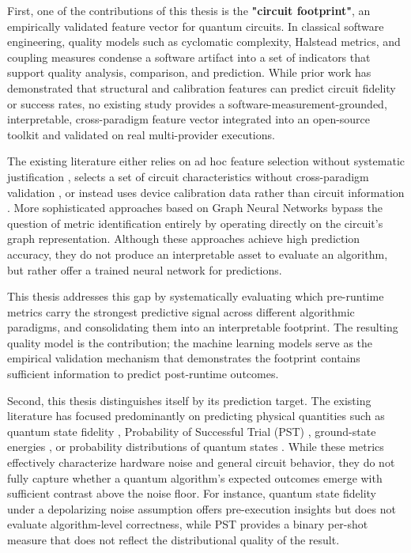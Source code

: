 \documentclass{article}
\begin{document}
First, one of the contributions of this thesis is the \textbf{"circuit footprint"}, an empirically validated feature vector for quantum circuits. In classical software engineering, quality models such as cyclomatic complexity, Halstead metrics, and coupling measures condense a software artifact into a set of indicators that support quality analysis, comparison, and prediction. While prior work has demonstrated that structural and calibration features can predict circuit fidelity or success rates, no existing study provides a software-measurement-grounded, interpretable, cross-paradigm feature vector integrated into an open-source toolkit and validated on real multi-provider executions.

The existing literature either relies on ad hoc feature selection without systematic justification \cite{saravananDataDrivenReliabilityModelsa_2023, aktarPredictingExpressibilityParameterized_2023}, selects a set of circuit characteristics without cross-paradigm validation \cite{liuReliabilityModelingNISQ_2020}, or instead uses device calibration data rather than circuit information \cite{escofetAccurateEfficientAnalytic_2025}. More sophisticated approaches based on Graph Neural Networks \cite{wangQuEstGraphTransformer_2022, wangTorchQuantumCaseStudya_2022} bypass the question of metric identification entirely by operating directly on the circuit's graph representation. Although these approaches achieve high prediction accuracy, they do not produce an interpretable asset to evaluate an algorithm, but rather offer a trained neural network for predictions.

This thesis addresses this gap by systematically evaluating which pre-runtime metrics carry the strongest predictive signal across different algorithmic paradigms, and consolidating them into an interpretable footprint. The resulting quality model is the contribution; the machine learning models serve as the empirical validation mechanism that demonstrates the footprint contains sufficient information to predict post-runtime outcomes.

Second, this thesis distinguishes itself by its prediction target. The existing literature has focused predominantly on predicting physical quantities such as quantum state fidelity \cite{escofetAccurateEfficientAnalytic_2025, vadaliQuantumCircuitFidelity_2024, wangQuEstGraphTransformer_2022, wangTorchQuantumCaseStudya_2022}, Probability of Successful Trial (PST) \cite{liuReliabilityModelingNISQ_2020}, ground-state energies \cite{liuOutputPredictionQuantum_2025}, or probability distributions of quantum states \cite{carrasquillaProbabilisticSimulationQuantum_2021}. While these metrics effectively characterize hardware noise and general circuit behavior, they do not fully capture whether a quantum algorithm's expected outcomes emerge with sufficient contrast above the noise floor. For instance, quantum state fidelity under a depolarizing noise assumption \cite{escofetAccurateEfficientAnalytic_2025} offers pre-execution insights but does not evaluate algorithm-level correctness, while PST \cite{liuReliabilityModelingNISQ_2020} provides a binary per-shot measure that does not reflect the distributional quality of the result.
\end{document}
